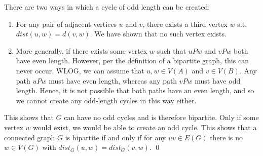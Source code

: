\linebreak 
There are two ways in which a cycle of odd length can be created: 
\begin{enumerate}
    \item For any pair of adjacent vertices $u$ and $v$, there exists a third vertex $w$ s.t. $dist(u, w) = d(v, w)$. We have shown that no such vertex exists. 
    \item More generally, if there exists some vertex $w$ such that $uPw$ and $vPw$ both have even length. However, per the definition of a bipartite graph, this can never occur. WLOG, we can assume that $u, w\in V(A)$ and $v \in V(B)$. Any path $uPw$ must have even length, whereas any path $vPw$ must have odd length. Hence, it is not possible that both paths have an even length, and so we cannot create any odd-length cycles in this way either. 
\end{enumerate}
This shows that $G$ can have no odd cycles and is therefore bipartite. Only if some vertex $w$ would exist, we would be able to create an odd cycle. This shows that a connected graph $G$ is bipartite if and only if for any $uv \in E(G)$ there is no $w \in V(G)$ with $dist_G(u,w) = dist_G(v,w).$ \qed